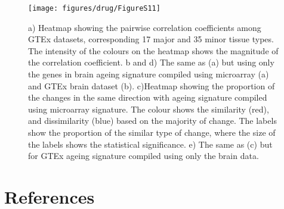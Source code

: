 \documentclass[12pt,twoside]{unicam}
\begin{document}
\begin{figure}

{\centering \texttt{[image: figures/drug/FigureS11]} 

}

\caption[Gene expression profiles of the ageing signature in different tissues]{a) Heatmap showing the pairwise correlation coefficients among GTEx datasets, corresponding 17 major and 35 minor tissue types. The intensity of the colours on the heatmap shows the magnitude of the correlation coefficient. b and d) The same as (a) but using only the genes in brain ageing signature compiled using microarray (a) and GTEx brain dataset (b). c)Heatmap showing the proportion of the changes in the same direction with ageing signature compiled using microarray signature. The colour shows the similarity (red), and dissimilarity (blue) based on the majority of change. The labels show the proportion of the similar type of change, where the size of the labels shows the statistical significance. e) The same as (c) but for GTEx ageing signature compiled using only the brain data.}\label{fig:drugFigS11}
\end{figure}

\hypertarget{references}{%
\chapter*{References}\label{references}}

\noindent
\setlength{\parindent}{-0.20in}
\setlength{\leftskip}{0.20in}
\setlength{\parskip}{8pt}
\thispagestyle{empty}

\end{document}
